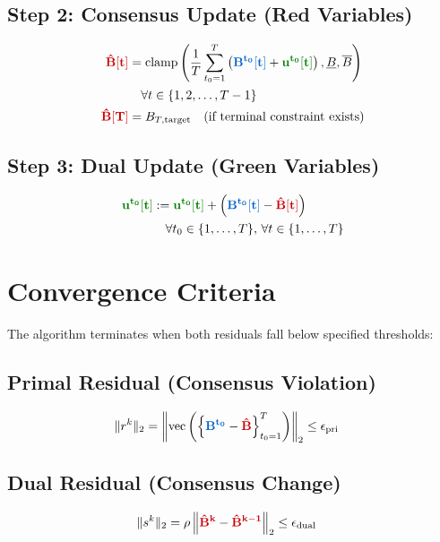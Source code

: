 \documentclass[11pt]{article}
\newcommand{\blueB}[1]{\textcolor{bluevar}{\mathbf{#1}}}      %
\newcommand{\redBhat}[1]{\textcolor{redvar}{\mathbf{#1}}}     %
\newcommand{\greenu}[1]{\textcolor{greenvar}{\mathbf{#1}}}    %
\begin{document}

\subsection{Step 2: Consensus Update (Red Variables)}
\begin{align}
\redBhat{\hat{B}[t]} &= \text{clamp}\left( \frac{1}{T} \sum_{t_0=1}^{T} \left( \blueB{B^{t_0}[t]} + \greenu{u^{t_0}[t]} \right), \underline{B}, \overline{B} \right) \\
&\quad \forall t \in \{1, 2, \ldots, T-1\} \\
\redBhat{\hat{B}[T]} &= B_{T,\text{target}} \quad \text{(if terminal constraint exists)}
\end{align}

\subsection{Step 3: Dual Update (Green Variables)}
\begin{align}
\greenu{u^{t_0}[t]} &:= \greenu{u^{t_0}[t]} + \left( \blueB{B^{t_0}[t]} - \redBhat{\hat{B}[t]} \right) \\
&\quad \forall t_0 \in \{1, \ldots, T\}, \, \forall t \in \{1, \ldots, T\}
\end{align}

\section{Convergence Criteria}

The algorithm terminates when both residuals fall below specified thresholds:

\subsection{Primal Residual (Consensus Violation)}
\begin{align}
\|r^k\|_2 &= \left\| \text{vec}\left( \left\{ \blueB{B^{t_0}} - \redBhat{\hat{B}} \right\}_{t_0=1}^T \right) \right\|_2 \leq \epsilon_{\text{pri}}
\end{align}

\subsection{Dual Residual (Consensus Change)}
\begin{align}
\|s^k\|_2 &= \rho \left\| \redBhat{\hat{B}^k} - \redBhat{\hat{B}^{k-1}} \right\|_2 \leq \epsilon_{\text{dual}}
\end{align}
\end{document}
